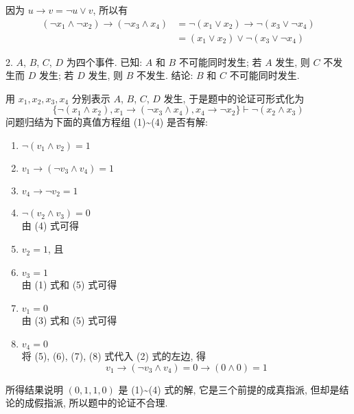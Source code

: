 \documentclass[boxes]{homework}
\begin{document}
\begin{solution}
    因为 $u\to v=\lnot u\lor v$, 所以有
    \begin{equation*}
        \begin{aligned}
            (\lnot x_1\land\lnot x_2)\to(\lnot x_3\land x_4) &= \lnot(x_1\lor x_2)\to \lnot(x_3\lor \lnot x_4)\\
            &= (x_1\lor x_2)\lor \lnot (x_3\lor \lnot x_4)
        \end{aligned}
    \end{equation*}
\end{solution}
\begin{problem}
    2. $A$, $B$, $C$, $D$ 为四个事件. 已知: $A$ 和 $B$ 不可能同时发生; 若 $A$ 发生, 则 $C$ 不发生而 $D$ 发生; 若 $D$ 发生, 则 $B$ 不发生. 结论: $B$ 和 $C$ 不可能同时发生.
\end{problem}
\begin{solution}
    用 $x_1, x_2, x_3, x_4$ 分别表示 $A$, $B$, $C$, $D$ 发生, 于是题中的论证可形式化为
    \begin{equation*}
        \{\lnot(x_1\land x_2), x_1\to (\lnot x_3\land x_4), x_4\to \lnot x_2\}\vdash \lnot (x_2\land x_3)
    \end{equation*}
    问题归结为下面的真值方程组 (1)\textasciitilde (4) 是否有解:
    \begin{enumerate}[label = (\arabic*), parsep = 0pt, itemsep = 0pt, topsep = .25em]
        \item $\lnot (v_1\land v_2)=1$
        \item $v_1\to (\lnot v_3\land v_4) = 1$
        \item $v_4\to \lnot v_2 = 1$
        \item $\lnot (v_2\land v_3) = 0$\\
        由 (4) 式可得
        \item $v_2 = 1$, 且
        \item $v_3 = 1$\\
        由 (1) 式和 (5) 式可得
        \item $v_1 = 0$\\
        由 (3) 式和 (5) 式可得
        \item $v_4 = 0$\\
        将 (5), (6), (7), (8) 式代入 (2) 式的左边, 得
        $$
        v_1\to (\lnot v_3\land v_4) = 0\to (0\land 0) = 1
        $$
    \end{enumerate}
    所得结果说明 $(0, 1, 1, 0)$ 是 (1)\textasciitilde (4) 式的解, 它是三个前提的成真指派, 但却是结论的成假指派, 所以题中的论证不合理.
\end{solution}
\end{document}
